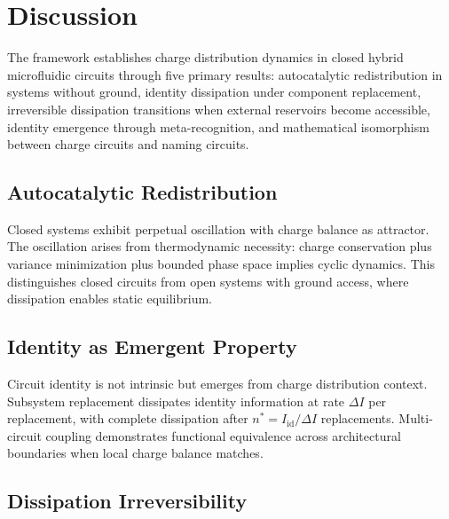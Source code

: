 \documentclass[12pt,a4paper]{article}
\theoremstyle{plain}
\theoremstyle{definition}
\theoremstyle{remark}
\begin{document}











\section{Discussion}
\label{sec:discussion}

The framework establishes charge distribution dynamics in closed hybrid microfluidic circuits through five primary results: autocatalytic redistribution in systems without ground, identity dissipation under component replacement, irreversible dissipation transitions when external reservoirs become accessible, identity emergence through meta-recognition, and mathematical isomorphism between charge circuits and naming circuits.

\subsection{Autocatalytic Redistribution}

Closed systems exhibit perpetual oscillation with charge balance as attractor. The oscillation arises from thermodynamic necessity: charge conservation plus variance minimization plus bounded phase space implies cyclic dynamics. This distinguishes closed circuits from open systems with ground access, where dissipation enables static equilibrium.

\subsection{Identity as Emergent Property}

Circuit identity is not intrinsic but emerges from charge distribution context. Subsystem replacement dissipates identity information at rate $\Delta I$ per replacement, with complete dissipation after $n^* = I_{\text{id}} / \Delta I$ replacements. Multi-circuit coupling demonstrates functional equivalence across architectural boundaries when local charge balance matches.

\subsection{Dissipation Irreversibility}
\end{document}
